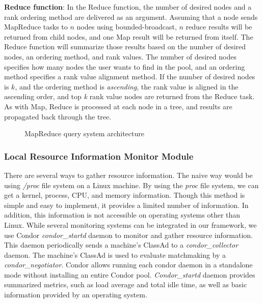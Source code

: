 \documentclass{acm_proc_article-sp}
\begin{document}
\textbf{Reduce function}: In the Reduce function, the number of desired nodes and a rank ordering method are delivered as an argument.
Assuming that a node sends MapReduce tasks to $n$ nodes using bounded-broadcast, \begin{math}n\end{math} reduce results will be returned from child nodes, 
and one Map result will be returned from itself. The Reduce function will summarize those results based on the number of desired nodes, an ordering method, and rank values. 
The number of desired nodes specifies how many nodes the user wants to find in the pool, and an ordering method specifies a rank value alignment method. 
If the number of desired nodes is $k$, and the ordering method is \textit{ascending}, the rank value is aligned in the ascending order, and top \textit{k} rank value nodes are returned from the Reduce task.
As with Map, Reduce is processed at each node in a tree, and results are propagated back through the tree.
\begin{figure}
\centering
{}
\caption{\label{fig:mr_arch}MapReduce query system architecture}
\end{figure}
\subsubsection{Local Resource Information Monitor Module}
There are several ways to gather resource information. The naive way would be using \textit{/proc} file system on a Linux machine. 
By using the \textit{proc} file system, we can get a kernel, process, CPU, and memory information. 
Though this method is simple and easy to implement, it provides a limited number of information. In addition, this information is not accessible on operating systems other than Linux.
While several monitoring systems can be integrated in our framework, we use Condor\cite{condor} \textit{condor\_startd} daemon to monitor and gather resource information. 
This daemon periodically sends a machine's ClassAd\cite{classad} to a \textit{condor\_collector} daemon. 
The machine's ClassAd is used to evaluate matchmaking by a \textit{condor\_negotiator}. 
Condor allows running each condor daemon in a standalone mode without
installing an entire Condor pool. \textit{Condor\_startd} daemon provides summarized metrics, such as load average and total idle time, as well as basic information provided by an operating system.
\end{document}
